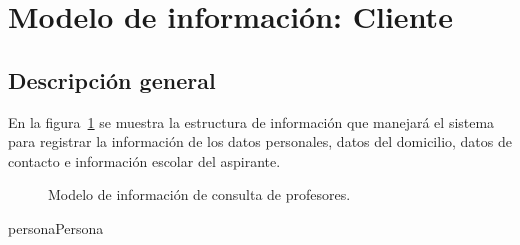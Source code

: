 \newpage

\section{Modelo de información: Cliente}

\subsection{Descripción general}

En la figura~\ref{fig:modeloinfoprofe} se muestra la estructura de información que manejará el sistema para registrar la información de los datos personales, datos del domicilio, datos de contacto e información escolar del aspirante.

\begin{figure}[htbp!]
	\begin{center}
		\caption{Modelo de información de consulta de profesores.}
		\label{fig:modeloinfoprofe}
	\end{center}
\end{figure}


\begin{BusinessEntity}{persona}{Persona}
	
	
	
	
	
\end{BusinessEntity}

